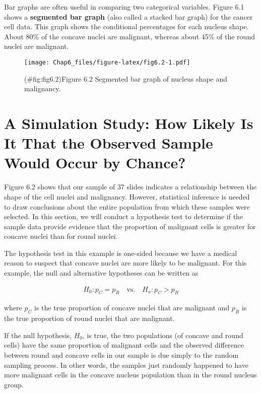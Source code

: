 \documentclass[
]{report}
\begin{document}
Bar graphs are often useful in comparing two categorical variables. Figure 6.1 shows a \textbf{segmented bar graph} (also called a stacked bar graph) for the cancer cell data. This graph shows the conditional percentages
for each nucleus shape. About 80\% of the concave nuclei are malignant, whereas about 45\% of the round
nuclei are malignant.

\begin{figure}
\centering
\texttt{[image: Chap6\_files/figure-latex/fig6.2-1.pdf]}
\caption{(\#fig:fig6.2)Figure 6.2 Segmented bar graph of nucleus shape and malignancy.}
\end{figure}

\section{\texorpdfstring{\textbf{A Simulation Study: How Likely Is It That the Observed Sample Would Occur by Chance?}}{A Simulation Study: How Likely Is It That the Observed Sample Would Occur by Chance?}}\label{a-simulation-study-how-likely-is-it-that-the-observed-sample-would-occur-by-chance}

Figure 6.2 shows that our sample of 37 slides indicates a relationship between the shape of the cell nuclei and malignancy. However, statistical inference is needed to draw conclusions about the entire population from which these samples were selected. In this section, we will conduct a hypothesis test to determine if the sample data provide evidence that the proportion of malignant cells is greater for concave nuclei than for round nuclei.

The hypothesis test in this example is one-sided because we have a medical reason to suspect that concave nuclei are more likely to be malignant. For this example, the null and alternative hypotheses can be written as

\begin{align}
H_0: p_C = p_R \quad\text{vs.}\quad H_a: p_C > p_R 
\tag{6.1}
\end{align}

where \(p_C\) is the true proportion of concave nuclei that are malignant and \(p_R\) is the true proportion of round nuclei that are malignant.

If the null hypothesis, \(H_0\), is true, the two populations (of concave and round cells) have the same proportion of malignant cells and the observed difference between round and concave cells in our sample is due simply to the random sampling process. In other words, the samples just randomly happened to have more malignant cells in the concave nucleus population than in the round nucleus group.
\end{document}
